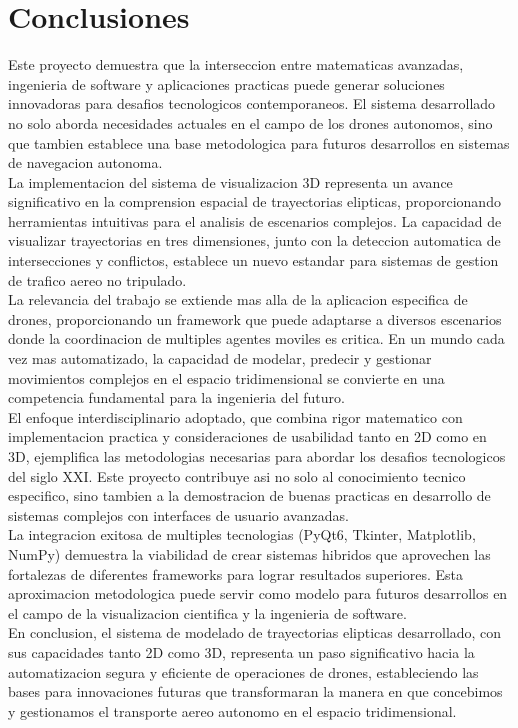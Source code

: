 \documentclass[12pt,a4paper]{article}
\begin{document}
\section{Conclusiones}

Este proyecto demuestra que la interseccion entre matematicas avanzadas, ingenieria de software y aplicaciones practicas puede generar soluciones innovadoras para desafios tecnologicos contemporaneos. El sistema desarrollado no solo aborda necesidades actuales en el campo de los drones autonomos, sino que tambien establece una base metodologica para futuros desarrollos en sistemas de navegacion autonoma.\\

La implementacion del sistema de visualizacion 3D representa un avance significativo en la comprension espacial de trayectorias elipticas, proporcionando herramientas intuitivas para el analisis de escenarios complejos. La capacidad de visualizar trayectorias en tres dimensiones, junto con la deteccion automatica de intersecciones y conflictos, establece un nuevo estandar para sistemas de gestion de trafico aereo no tripulado.\\

La relevancia del trabajo se extiende mas alla de la aplicacion especifica de drones, proporcionando un framework que puede adaptarse a diversos escenarios donde la coordinacion de multiples agentes moviles es critica. En un mundo cada vez mas automatizado, la capacidad de modelar, predecir y gestionar movimientos complejos en el espacio tridimensional se convierte en una competencia fundamental para la ingenieria del futuro.\\

El enfoque interdisciplinario adoptado, que combina rigor matematico con implementacion practica y consideraciones de usabilidad tanto en 2D como en 3D, ejemplifica las metodologias necesarias para abordar los desafios tecnologicos del siglo XXI. Este proyecto contribuye asi no solo al conocimiento tecnico especifico, sino tambien a la demostracion de buenas practicas en desarrollo de sistemas complejos con interfaces de usuario avanzadas.\\

La integracion exitosa de multiples tecnologias (PyQt6, Tkinter, Matplotlib, NumPy) demuestra la viabilidad de crear sistemas hibridos que aprovechen las fortalezas de diferentes frameworks para lograr resultados superiores. Esta aproximacion metodologica puede servir como modelo para futuros desarrollos en el campo de la visualizacion cientifica y la ingenieria de software.\\

En conclusion, el sistema de modelado de trayectorias elipticas desarrollado, con sus capacidades tanto 2D como 3D, representa un paso significativo hacia la automatizacion segura y eficiente de operaciones de drones, estableciendo las bases para innovaciones futuras que transformaran la manera en que concebimos y gestionamos el transporte aereo autonomo en el espacio tridimensional.
\end{document}
